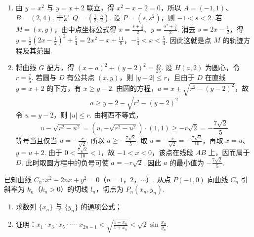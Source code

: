 \begin{solution}
\begin{enumerate}
\item 由 \(y=x^2\) 与 \(y=x+2\) 联立，得 \(x^2-x-2=0\)，所以 \(A=(-1,1)\)、\(B=(2,4)\). 于是 \(Q=\left(\frac12,\frac52\right)\). 设 \(P=(s,s^2)\)，则 \(-1<s<2\). 若 \(M=(x,y)\)，由中点坐标公式得 \(x=\frac{s+\frac{1}{2}}{2}\)、\(y=\frac{s^2+\frac{5}{2}}{2}\). 消去 \(s=2x-\frac12\)，得
\(y=\frac12\left(2x-\frac12\right)^2+\frac54=2x^2-x+\frac{11}{8}\)，\(-\frac14<x<\frac54\).
因此这就是点 \(M\) 的轨迹方程及其范围.
\item 将曲线 \(G\) 配方，得 \((x-a)^2+(y-2)^2=\frac{49}{25}\). 设 \(H(a,2)\) 为圆心，令 \(r=\frac75\). 若圆与 \(D\) 有公共点 \((x,y)\)，则 \(|y-2|\leqslant r\)，且由于 \(D\) 在直线 \(y=x+2\) 的下方，有 \(x\geqslant y-2\). 由圆的方程，\(a=x\pm\sqrt{r^2-(y-2)^2}\)，故
\[
a\geqslant y-2-\sqrt{r^2-(y-2)^2}
\]
令 \(u=y-2\)，则 \(|u|\leqslant r\). 由柯西不等式，
\[
u-\sqrt{r^2-u^2}=(u,-\sqrt{r^2-u^2})\cdot(1,1)\geqslant-r\sqrt2=-\frac{7\sqrt2}{5}
\]
等号当且仅当 \(u=-\frac r{\sqrt2}\). 所以 \(a\geqslant-\frac{7\sqrt2}{5}\). 取 \(u=-\frac r{\sqrt2}=-\frac{7\sqrt2}{10}\)，再取 \(x=u\)、\(y=u+2\). 由于 \(0<\frac{7\sqrt2}{10}<1\)，故 \(-1<x<0\)，该点在线段 \(AB\) 上，因而属于 \(D\). 此时取圆方程中的负号可使 \(a=-r\sqrt2\). 因此 \(a\) 的最小值为 \(-\frac{7\sqrt2}{5}\).
\end{enumerate}
\end{solution}

\begin{problem}
已知曲线 \(C_n: x^2 - 2nx + y^2 = 0\)（\(n = 1\)，\(2\)，\(\cdots\)）. 从点 \(P(-1,0)\) 向曲线 \(C_n\) 引斜率为 \(k_n\)（\(k_n > 0\)）的切线 \(l_n\)，切点为 \(P_n(x_n, y_n)\).
\begin{enumerate}
\item 求数列 \(\{x_n\}\) 与 \(\{y_n\}\) 的通项公式；
\item 证明：\(x_1 \cdot x_3 \cdot x_5 \cdot \cdots \cdot x_{2n-1} < \sqrt{\frac{1 - x_n}{1 + x_n}} < \sqrt2\sin \frac{x_n}{y_n}\).
\end{enumerate}
\end{problem}

